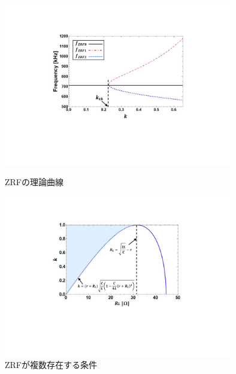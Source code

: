 \begin{figure}[h]
\begin{center}

        \includegraphics[width=100mm]{figures/zrfgraph.pdf}
		\caption{ZRFの理論曲線}
		\label{zrfgraph}
        \vspace{5mm}
        
		\includegraphics[width=100mm]{figures/boundary.pdf}
		\caption{ZRFが複数存在する条件}
		\label{boundary}

\end{center}
\end{figure}  
